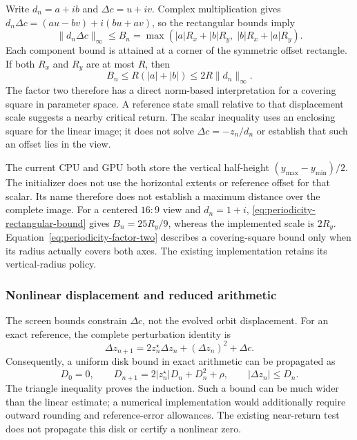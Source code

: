 Write $d_n=a+ib$ and $\Delta c=u+iv$. Complex multiplication gives
$d_n\Delta c=(au-bv)+i(bu+av)$, so the rectangular bounds imply
\begin{equation}
 \|d_n\Delta c\|_\infty\le B_n
 =\max(|a|R_x+|b|R_y,\;|b|R_x+|a|R_y).
 \label{eq:periodicity-rectangular-bound}
\end{equation}
Each component bound is attained at a corner of the symmetric offset
rectangle. If both $R_x$ and $R_y$ are at most $R$, then
\begin{equation}
 B_n\le R(|a|+|b|)\le2R\|d_n\|_\infty.
 \label{eq:periodicity-factor-two}
\end{equation}
The factor two therefore has a direct norm-based interpretation for a
covering square in parameter space. A reference state small relative to
that displacement scale suggests a nearby critical return. The scalar
inequality uses an enclosing square for the linear image; it does not solve
$\Delta c=-z_n/d_n$ or establish that such an offset lies in the view.

The current CPU  and GPU  both store
the vertical half-height $(y_{\max}-y_{\min})/2$. The initializer does not
use the horizontal extents or reference offset for that scalar. Its name
therefore does not establish a maximum distance over the complete image.
For a centered $16{:}9$ view and $d_n=1+i$,
\eqref{eq:periodicity-rectangular-bound} gives $B_n=25R_y/9$, whereas
the implemented scale is $2R_y$. Equation~\eqref{eq:periodicity-factor-two}
describes a covering-square bound only when its radius actually covers
both axes. The existing implementation retains its vertical-radius policy.

\subsubsection{Nonlinear displacement and reduced arithmetic}
\label{subsec:ref-orbit-near-return-limits}

The screen bounds constrain $\Delta c$, not the evolved orbit displacement.
For an exact reference, the complete perturbation identity is
\begin{equation}
 \Delta z_{n+1}=2z_n^\star\Delta z_n+(\Delta z_n)^2+\Delta c.
 \label{eq:periodicity-full-displacement}
\end{equation}
Consequently, a uniform disk bound in exact arithmetic can be propagated as
\begin{equation}
 D_0=0,\qquad
 D_{n+1}=2|z_n^\star|D_n+D_n^2+\rho,
 \qquad |\Delta z_n|\le D_n.
 \label{eq:periodicity-displacement-disk}
\end{equation}
The triangle inequality proves the induction. Such a bound can be much wider
than the linear estimate; a numerical implementation would additionally
require outward rounding and reference-error allowances. The existing
near-return test does not propagate this disk or certify a nonlinear zero.

